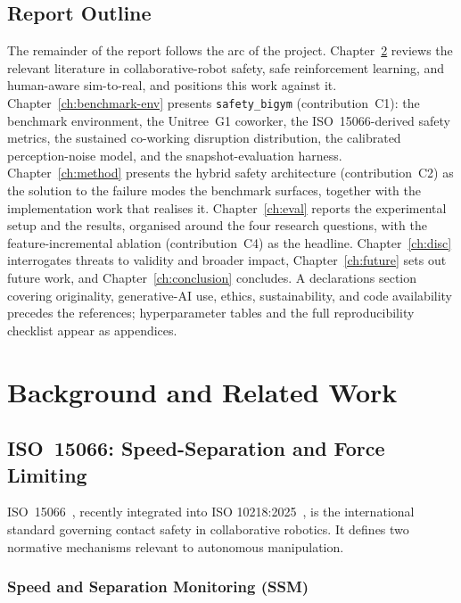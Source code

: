 \documentclass[11pt,a4paper]{report}
\newcommand{\ssm}{SSM}
\newcommand{\iso}{ISO~15066}
\newcommand{\sbigym}{\texttt{safety\_bigym}}
\begin{document}
\section{Report Outline}
\label{sec:intro:outline}

The remainder of the report follows the arc of the project.
Chapter~\ref{ch:background} reviews the relevant literature in
collaborative-robot safety, safe reinforcement learning, and
human-aware sim-to-real, and positions this work against it.
Chapter~\ref{ch:benchmark-env} presents \sbigym{} (contribution~C1):
the benchmark environment, the Unitree~G1 coworker, the
\iso{}-derived safety metrics, the sustained co-working disruption
distribution, the calibrated perception-noise model, and the
snapshot-evaluation harness. Chapter~\ref{ch:method} presents the
hybrid safety architecture (contribution~C2) as the solution to the
failure modes the benchmark surfaces, together with the
implementation work that realises it. Chapter~\ref{ch:eval} reports
the experimental setup and the results, organised around the four
research questions, with the feature-incremental ablation
(contribution~C4) as the headline. Chapter~\ref{ch:disc} interrogates
threats to validity and broader impact, Chapter~\ref{ch:future} sets
out future work, and Chapter~\ref{ch:conclusion} concludes. A
declarations section covering originality, generative-AI use, ethics,
sustainability, and code availability precedes the references;
hyperparameter tables and the full reproducibility checklist appear
as appendices.


\chapter{Background and Related Work}
\label{ch:background}

\section{\iso{}: Speed-Separation and Force Limiting}
\label{sec:bg:iso}

\iso{}~\cite{iso15066}, recently integrated into ISO
10218:2025~\cite{iso10218}, is the international standard governing
contact safety in collaborative robotics. It defines two normative
mechanisms relevant to autonomous manipulation.

\subsection{Speed and Separation Monitoring (\ssm{})}
\label{sec:bg:iso:ssm}
\end{document}
